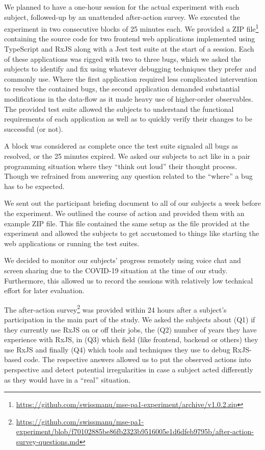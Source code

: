 \documentclass[sigplan,screen,review]{acmart}
\begin{document}
We planned to have a one-hour session for the actual experiment with each subject, followed-up by an unattended after-action survey. We executed the experiment in two consecutive blocks of 25 minutes each. We provided a ZIP file\footnote{\url{https://github.com/swissmanu/mse-pa1-experiment/archive/v1.0.2.zip}} containing the source code for two frontend web applications implemented using TypeScript and RxJS along with a Jest test suite at the start of a session. Each of these applications was rigged with two to three bugs, which we asked the subjects to identify and fix using whatever debugging techniques they prefer and commonly use. Where the first application required less complicated intervention to resolve the contained bugs, the second application demanded substantial modifications in the data-flow as it made heavy use of higher-order observables. The provided test suite allowed the subjects to understand the functional requirements of each application as well as to quickly verify their changes to be successful (or not).

A block was considered as complete once the test suite signaled all bugs as resolved, or the 25 minutes expired. We asked our subjects to act like in a pair programming situation where they ``think out loud'' their thought process. Though we refrained from answering any question related to the ``where'' a bug has to be expected.

We sent out the participant briefing document to all of our subjects a week before the experiment. We outlined the course of action and provided them with an example ZIP file. This file contained the same setup as the file provided at the experiment and allowed the subjects to get accustomed to things like starting the web applications or running the test suites.

We decided to monitor our subjects' progress remotely using voice chat and screen sharing due to the COVID-19 situation at the time of our study. Furthermore, this allowed us to record the sessions with relatively low technical effort for later evaluation.

The after-action survey\footnote{\url{https://github.com/swissmanu/mse-pa1-experiment/blob/f70102885be86fb2323b9516005e1d6dfeb9795b/after-action-survey-questions.md}} was provided within 24 hours after a subject's participation in the main part of the study. We asked the subjects about (Q1) if they currently use RxJS on or off their jobs, the (Q2) number of years they have experience with RxJS, in (Q3) which field (like frontend, backend or others) they use RxJS and finally (Q4) which tools and techniques they use to debug RxJS-based code. The respective answers allowed us to put the observed actions into perspective and detect potential irregularities in case a subject acted differently as they would have in a ``real'' situation.
\end{document}
